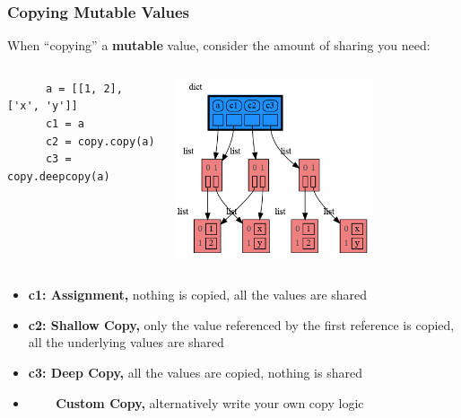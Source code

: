 \documentclass[10pt, colorlinks=true, urlcolor=blue]{beamer}
\begin{document}
\begin{frame}[fragile]
  \frametitle {Copying Mutable Values}
  When ``copying'' a \textbf{mutable} value, consider the amount of sharing you need:
  \vspace{-1em}
\begin{columns}
  \begin{verbatim}
      a = [[1, 2], ['x', 'y']]
      c1 = a
      c2 = copy.copy(a)
      c3 = copy.deepcopy(a)
    \end{verbatim}
    \begin{center}\includegraphics[width=0.7\textwidth]{figures/copy.png}\end{center}
\end{columns}
    \begin{itemize}
        \item \textbf{c1: Assignment,} nothing is copied, all the values are shared
        \item \textbf{c2: Shallow Copy,} only the value referenced by the first reference is copied, all the underlying values are shared
        \item \textbf{c3: Deep Copy,} all the values are copied, nothing is shared
        \item \ \ \, \,\, \textbf{Custom Copy,} alternatively write your own copy logic
    \end{itemize}
\end{frame}
\end{document}
